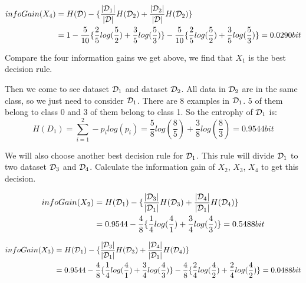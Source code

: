 \documentclass[10pt]{article}
\begin{document}
	\begin{equation}
	\begin{aligned}
	infoGain(X_4)&=H({\cal D})-\{\frac{\vert {\cal D}_1\vert}{\vert \cal D\vert}H({\cal D}_2)+\frac{\vert {\cal D}_2\vert}{\vert \cal D\vert}H({\cal D}_2)\}\\
	&=1-\frac{5}{10}\{ \frac{2}{5}log(\frac{5}{2})+\frac{3}{5}log(\frac{5}{3})\}-\frac{5}{10}\{ \frac{2}{5}log(\frac{5}{2})+\frac{3}{5}log(\frac{5}{3})\}=0.0290 bit
	\end{aligned}
	\end{equation} \par
	Compare the four information gains we get above, we find that $X_1$ is the best decision rule.
	\par
	
	Then we come to see dataset ${\cal D}_1$ and dataset ${\cal D}_2$. All data in ${\cal D}_2$ are in the same class, so we just need to consider ${\cal D}_1$. There are 8 examples in ${\cal D}_1$. 5 of them belong to class 0 and 3 of them belong to class 1. So the entrophy of ${\cal D}_1$ is:
	\begin{equation}
		H(D_1)=\sum_{i=1}^{2} -p_i log(p_i)=\frac{5}{8}log(\frac{8}{5})+\frac{3}{8}log(\frac{8}{3})=0.9544 bit
	\end{equation}
	
	We will also choose another best decision rule for ${\cal D}_1$. This rule will divide ${\cal D}_1$ to two dataset ${\cal D}_3$ and ${\cal D}_4$. Calculate the information gain of $X_2$, $X_3$, $X_4$ to get this decision.
	
	\begin{equation}
	\begin{aligned}
	infoGain(X_2)&=H({\cal D}_1)-\{\frac{\vert {\cal D}_3\vert}{\vert {\cal D}_1 \vert}H({\cal D}_3)+\frac{\vert {\cal D}_4\vert}{\vert {\cal D}_1 \vert}H({\cal D}_4)\}\\
	&=0.9544-\frac{4}{8}\{ \frac{1}{4}log(\frac{4}{1})+\frac{3}{4}log(\frac{4}{3})\}=0.5488 bit
	\end{aligned}
	\end{equation} 
	
	\begin{equation}
	\begin{aligned}
	infoGain(X_3)&=H({\cal D}_1)-\{\frac{\vert {\cal D}_3\vert}{\vert {\cal D}_1 \vert}H({\cal D}_3)+\frac{\vert {\cal D}_4\vert}{\vert {\cal D}_1 \vert}H({\cal D}_4)\}\\
	&=0.9544-\frac{4}{8}\{ \frac{1}{4}log(\frac{4}{1})+\frac{3}{4}log(\frac{4}{3})\}-\frac{4}{8}\{ \frac{2}{4}log(\frac{4}{2})+\frac{2}{4}log(\frac{4}{2})\}=0.0488 bit
	\end{aligned}
	\end{equation} 
	
\end{document}
